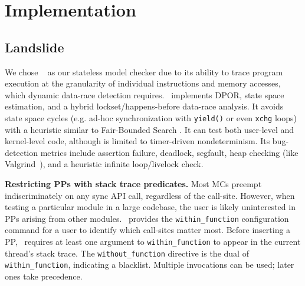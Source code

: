 \section{Implementation}
\label{sec:implementation}

\subsection{Landslide}
\label{sec:landslide}

We chose \landslide~\cite{landslide} as our stateless model checker due to its ability to trace program execution at the granularity of individual instructions and memory accesses, which dynamic data-race detection requires.
\landslide~implements DPOR,
state space estimation, and a hybrid lockset/happens-before data-race analysis.
It avoids state space cycles (e.g. ad-hoc synchronization with {\tt yield()} or even {\tt xchg} loops) with a heuristic similar to Fair-Bounded Search \cite{bpor}. %
It can test both user-level and kernel-level code, although is limited to timer-driven nondeterminism.
Its bug-detection metrics include assertion failure, deadlock, segfault, heap checking (like Valgrind~\cite{valgrind}), and a heuristic infinite loop/livelock check.

{\bf Restricting PPs with stack trace predicates.}
Most MCs preempt indiscriminately on any sync API call, regardless of the call-site.
However, when testing a particular module in a large codebase,
the user is likely uninterested in PPs arising from other modules.
\landslide~provides the {\tt within\_function} configuration command for a user to identify which call-sites matter most.
Before inserting a PP, \landslide~requires at least one argument to {\tt within\_function} to appear in the current thread's stack trace.
The {\tt without\_function} directive is the dual of {\tt within\_function}, indicating a blacklist.
Multiple invocations can be used; later ones take precedence.

